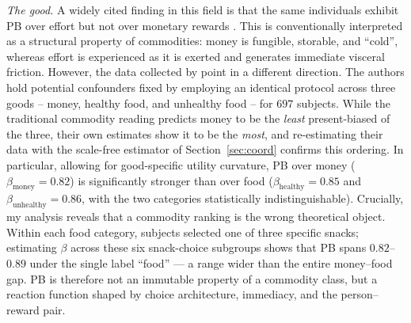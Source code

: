 \documentclass[11pt,a4paper]{article}
\theoremstyle{plain}
\theoremstyle{definition}
\begin{document}
\emph{The good.} 
A widely cited finding in this field is that the same individuals exhibit PB over effort but not over monetary rewards \citep{ans2015}. This is conventionally interpreted as a structural property of commodities: money is fungible, storable, and ``cold'', %
whereas effort is experienced as it is exerted and generates immediate visceral friction. 
However, the data collected by \citet{cheung2022} point in a different direction. The authors hold potential confounders fixed by employing an identical protocol across three goods -- money, healthy food, and unhealthy food -- for $697$ subjects. %
While the traditional commodity reading predicts money to be the \emph{least} present-biased of the three, 
their own estimates show it to be the \emph{most}, and re-estimating their data with the scale-free estimator of Section~\ref{sec:coord} confirms this ordering. 
In particular, allowing for good-specific utility curvature, PB over money ($\beta_{\mathrm{money}}=0.82$) is significantly stronger %
than over food ($\beta_{\mathrm{healthy}}=0.85$ and $\beta_{\mathrm{unhealthy}}=0.86$, with the two categories statistically indistinguishable).
Crucially, my analysis reveals that a commodity ranking is the wrong theoretical object. Within each food category, subjects selected one of three specific snacks; estimating $\beta$ across these six snack-choice subgroups shows that PB spans $0.82$--$0.89$ under the single label ``food'' --- a range wider than the entire money--food gap. 
PB is therefore not an immutable property of a commodity class, but a reaction function shaped by choice architecture, immediacy, and the person--reward pair.
\end{document}
